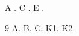 \documentclass{article}
\begin{document}
A \cite{c,a,b}. C \cite{k1,a,k2}. E \cite{a,a,b,c}.
\begin{thebibliography}{9}
 A.  B.  C.
 K1.  K2.
\end{thebibliography}
\end{document}
